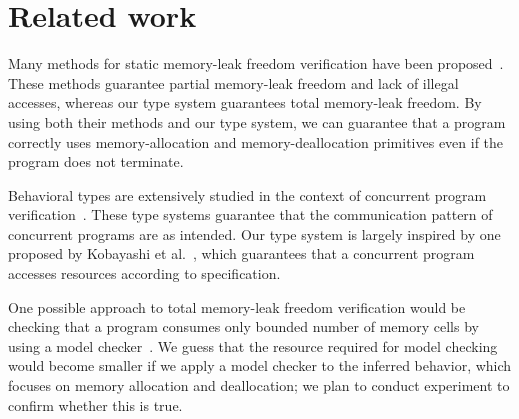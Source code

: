 
\section{Related work}\label{sec:relatedwork}
Many methods for static memory-leak freedom verification have been
proposed~\cite{DBLP:conf/aplas/SuenagaK09,DBLP:conf/pldi/HeineL03,DBLP:conf/sigsoft/XieA05,DBLP:journals/scp/SwamyHMGJ06,DBLP:conf/sas/OrlovichR06,DBLP:conf/issta/SuiYX12}. These
methods guarantee partial memory-leak freedom and lack of illegal
accesses, whereas our type system guarantees total memory-leak
freedom. By using both their methods and our type system, we can
guarantee that a program correctly uses memory-allocation and
memory-deallocation primitives even if the program does not terminate.

Behavioral types are extensively studied in the context of concurrent
program
verification~\cite{DBLP:conf/esop/HondaVK98,DBLP:journals/tcs/IgarashiK04,DBLP:conf/esop/VieiraCS08,DBLP:journals/lmcs/KobayashiSW06}.
These type systems guarantee that the communication pattern of
concurrent programs are as intended.  Our type system is largely
inspired by one proposed by Kobayashi et
al.~\cite{DBLP:journals/lmcs/KobayashiSW06}, which guarantees that a
concurrent program accesses resources according to specification.


One possible approach to total memory-leak freedom verification would
be checking that a program consumes only bounded number of memory
cells by using a model
checker~\cite{clarke1999model,ben2008principles,beyer2011cpachecker}.
We guess that the resource required for model checking would become
smaller if we apply a model checker to the inferred behavior, which
focuses on memory allocation and deallocation; we plan to conduct
experiment to confirm whether this is true.
